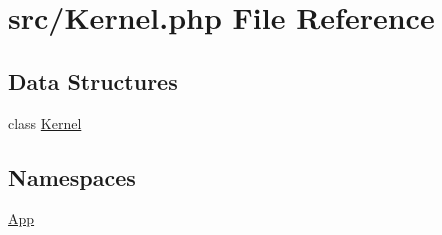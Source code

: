 \hypertarget{_kernel_8php}{}\section{src/\+Kernel.php File Reference}
\label{_kernel_8php}
\subsection*{Data Structures}
\begin{DoxyCompactItemize}
\item 
class \mbox{\hyperlink{class_app_1_1_kernel}{Kernel}}
\end{DoxyCompactItemize}
\subsection*{Namespaces}
\begin{DoxyCompactItemize}
\item 
 \mbox{\hyperlink{namespace_app}{App}}
\end{DoxyCompactItemize}
